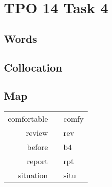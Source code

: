 \section{TPO 14 Task 4}

\subsection{Words}

\subsection{Collocation}

\subsection{Map}

\begin{tabular}{rc@{\quad$\to$\quad}l}
    comfortable &  & comfy \\
    review      &  & rev   \\
    before      &  & b4    \\
    report      &  & rpt   \\
    situation   &  & situ  \\
\end{tabular}
